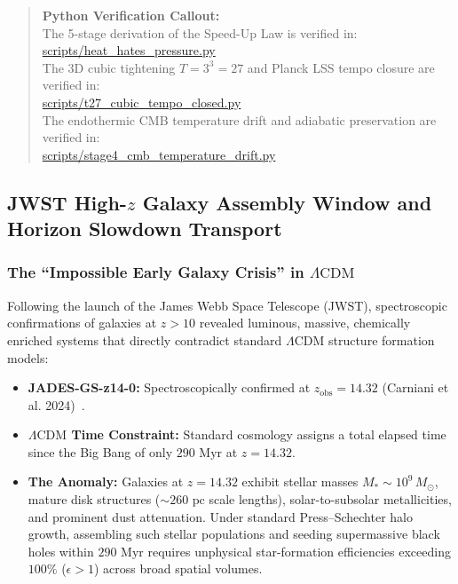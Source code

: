 \documentclass[11pt,a4paper]{article}
\begin{document}
\begin{quote}
\textbf{Python Verification Callout:}\\
The 5-stage derivation of the Speed-Up Law is verified in:\\
\url{scripts/heat_hates_pressure.py}\\
The 3D cubic tightening $T = 3^3 = 27$ and Planck LSS tempo closure are verified in:\\
\url{scripts/t27_cubic_tempo_closed.py}\\
The endothermic CMB temperature drift and adiabatic preservation are verified in:\\
\url{scripts/stage4_cmb_temperature_drift.py}
\end{quote}


\subsection{JWST High-$z$ Galaxy Assembly Window and Horizon Slowdown Transport}
\label{subsec:jwst_window}

\subsubsection{The ``Impossible Early Galaxy Crisis'' in $\Lambda\text{CDM}$}
\label{subsubsec:jwst_crisis}

Following the launch of the James Webb Space Telescope (JWST), spectroscopic confirmations of galaxies at $z > 10$ revealed luminous, massive, chemically enriched systems that directly contradict standard $\Lambda\text{CDM}$ structure formation models:
\begin{itemize}
    \item \textbf{JADES-GS-z14-0:} Spectroscopically confirmed at $z_{\text{obs}} = 14.32$ (Carniani et al. 2024)~\cite{Carniani2024}.
    \item \textbf{$\Lambda\text{CDM}$ Time Constraint:} Standard cosmology assigns a total elapsed time since the Big Bang of only \textbf{$290\text{ Myr}$} at $z = 14.32$.
    \item \textbf{The Anomaly:} Galaxies at $z = 14.32$ exhibit stellar masses $M_* \sim 10^9\,M_\odot$, mature disk structures ($\sim 260\text{ pc}$ scale lengths), solar-to-subsolar metallicities, and prominent dust attenuation. Under standard Press--Schechter halo growth, assembling such stellar populations and seeding supermassive black holes within $290\text{ Myr}$ requires unphysical star-formation efficiencies exceeding $100\%$ ($\epsilon > 1$) across broad spatial volumes.
\end{itemize}
\end{document}
